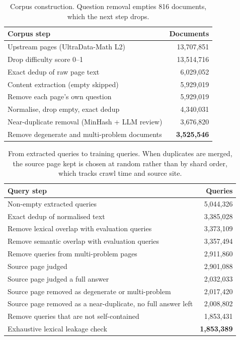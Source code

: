 \begin{table}[h]
\centering
\small
\begin{tabular}{P{4.6cm}r}
\toprule
Corpus step & Documents \\
\midrule
Upstream pages (UltraData-Math L2) & 13,707,851 \\
Drop difficulty score 0--1 & 13,514,716 \\
Exact dedup of raw page text & 6,029,052 \\
Content extraction (empty skipped) & 5,929,019 \\
Remove each page's own question & 5,929,019 \\
Normalise, drop empty, exact dedup & 4,340,031 \\
Near-duplicate removal (MinHash + LLM review) & 3,676,820 \\
Remove degenerate and multi-problem documents & \textbf{3,525,546} \\
\bottomrule
\end{tabular}
\caption{Corpus construction. Question removal empties 816 documents, which the next step drops.}
\label{tab:corpus-pipeline}
\end{table}

\begin{table}[h]
\centering
\small
\begin{tabular}{P{4.6cm}r}
\toprule
Query step & Queries \\
\midrule
Non-empty extracted queries & 5,044,326 \\
Exact dedup of normalised text & 3,385,028 \\
Remove lexical overlap with evaluation queries & 3,373,109 \\
Remove semantic overlap with evaluation queries & 3,357,494 \\
Remove queries from multi-problem pages & 2,911,860 \\
Source page judged & 2,901,088 \\
Source page judged a full answer & 2,032,033 \\
Source page removed as degenerate or multi-problem & 2,017,420 \\
Source page removed as a near-duplicate, no full answer left & 2,008,802 \\
Remove queries that are not self-contained & 1,853,431 \\
Exhaustive lexical leakage check & \textbf{1,853,389} \\
\bottomrule
\end{tabular}
\caption{From extracted queries to training queries. When duplicates are merged, the source page kept is chosen at random rather than by shard order, which tracks crawl time and source site.}
\label{tab:query-pipeline}
\end{table}


